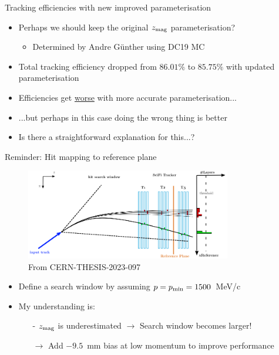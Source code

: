 \documentclass[xcolor={dvipsnames}]{beamer}
\begin{document}
\begin{frame}{Tracking efficiencies with new improved parameterisation}
  \vspace{0.0cm}
  \begin{itemize}
    \setlength\itemsep{1.0em}
    \item{Perhaps we should keep the original $z_{\rm mag}$ parameterisation?}
    \begin{itemize}
      \item{Determined by Andre G{\"u}nther using DC19 MC}
    \end{itemize}
    \item{Total tracking efficiency dropped from $86.01\%$ to $85.75\%$ with updated parameterisation}
    \item{Efficiencies get \underline{worse} with more accurate parameterisation...}
    \item{...but perhaps in this case doing the wrong thing is better}
    \item{Is there a straightforward explanation for this...?}
  \end{itemize}
\end{frame}

\begin{frame}{Reminder: Hit mapping to reference plane}
  \vspace{0.0cm}
  \begin{figure}[htb]
    \centering
    \includegraphics[width=0.8\textwidth]{Plots/HoughTransform.png}
  \caption*{\small From CERN-THESIS-2023-097}
  \end{figure}
  \vspace{-0.3cm}
  \begin{itemize}
    \item{Define a search window by assuming $p = p_{\rm min} = 1500$~MeV/c}
    \item{My understanding is:}
    \begin{itemize}
      \item[-]{$z_{\rm mag}$ is underestimated $\to$ Search window becomes larger!}
      \item[$\to$]{Add $-9.5$~mm bias at low momentum to improve performance}
    \end{itemize}
  \end{itemize}
\end{frame}
\end{document}
